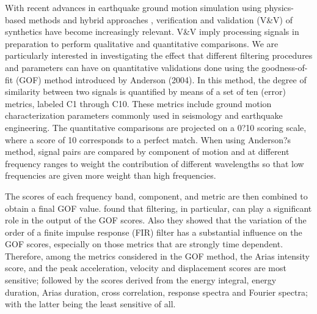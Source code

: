 
\introduction

With recent advances in earthquake ground motion simulation using physics-based methods and hybrid approaches \citep[e.g.,][]{Bielak_2010_GJI, Graves_2010}, verification and validation (V\&V) of synthetics have become increasingly relevant. V\&V imply processing signals in preparation to perform qualitative and quantitative comparisons. We are particularly interested in investigating the effect that different filtering procedures and parameters can have on quantitative validations done using the goodness-of-fit (GOF) method introduced by Anderson (2004). In this method, the degree of similarity between two signals is quantified by means of a set of ten (error) metrics, labeled C1 through C10. These metrics include ground motion characterization parameters commonly used in seismology and earthquake engineering. The quantitative comparisons are projected on a 0?10 scoring scale, where a score of 10 corresponds to a perfect match. When using Anderson?s method, signal pairs are compared by component of motion and at different frequency ranges to weight the contribution of different wavelengths so that low frequencies are given more weight than high frequencies.

The scores of each frequency band, component, and metric are then combined to obtain a final GOF value. \citet{Khoshnevis_2015} found that filtering, in particular, can play a significant role in the output of the GOF scores. Also they showed that the variation of the order of a finite impulse response (FIR) filter has a substantial influence on the GOF scores, especially on those metrics that are strongly time dependent. Therefore, among the metrics considered in the GOF method, the Arias intensity score, and the peak acceleration, velocity and displacement scores are most sensitive; followed by the scores derived from the energy integral, energy duration, Arias duration, cross correlation, response spectra and Fourier spectra; with the latter being the least sensitive of all.


